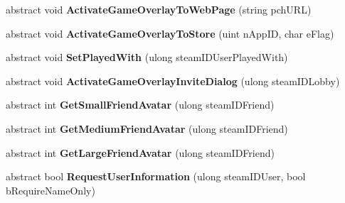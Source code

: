 \begin{DoxyCompactItemize}
abstract void {\bfseries Activate\+Game\+Overlay\+To\+Web\+Page} (string pch\+U\+RL)
\item 
\mbox{\label{class_valve_1_1_steamworks_1_1_i_steam_friends_af04fe7d3fe5a5642f1188bff8ed082dc}} 
abstract void {\bfseries Activate\+Game\+Overlay\+To\+Store} (uint n\+App\+ID, char e\+Flag)
\item 
\mbox{\label{class_valve_1_1_steamworks_1_1_i_steam_friends_a63002c134e99a7ed80c2acec09a6d044}} 
abstract void {\bfseries Set\+Played\+With} (ulong steam\+I\+D\+User\+Played\+With)
\item 
\mbox{\label{class_valve_1_1_steamworks_1_1_i_steam_friends_a4cfa95652c9443a7b0c054589a233bb4}} 
abstract void {\bfseries Activate\+Game\+Overlay\+Invite\+Dialog} (ulong steam\+I\+D\+Lobby)
\item 
\mbox{\label{class_valve_1_1_steamworks_1_1_i_steam_friends_a4e5e56fe16c5cee587f1b1446e224af0}} 
abstract int {\bfseries Get\+Small\+Friend\+Avatar} (ulong steam\+I\+D\+Friend)
\item 
\mbox{\label{class_valve_1_1_steamworks_1_1_i_steam_friends_a9691cb8cba319207e33d7f0a816b1f80}} 
abstract int {\bfseries Get\+Medium\+Friend\+Avatar} (ulong steam\+I\+D\+Friend)
\item 
\mbox{\label{class_valve_1_1_steamworks_1_1_i_steam_friends_a75ff409ecab75d3a5e859317591a4464}} 
abstract int {\bfseries Get\+Large\+Friend\+Avatar} (ulong steam\+I\+D\+Friend)
\item 
\mbox{\label{class_valve_1_1_steamworks_1_1_i_steam_friends_a5a46d2ba3013ad0242a25abdd44ad28f}} 
abstract bool {\bfseries Request\+User\+Information} (ulong steam\+I\+D\+User, bool b\+Require\+Name\+Only)
\item 
\mbox{\label{class_valve_1_1_steamworks_1_1_i_steam_friends_aafc517387967229f91a9832b1b43b2b9}} 

\end{DoxyCompactItemize}
